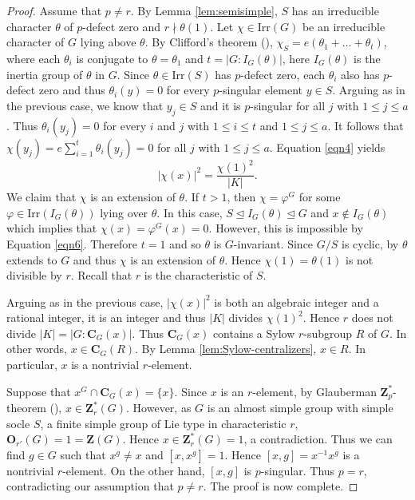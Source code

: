\documentclass[twoside,a4paper,reqno,12pt]{amsart}
\newcommand{\<}{\langle}
\renewcommand{\>}{\rangle}
\newcommand{\leqs}{\leqslant}
\newcommand{\OB}{\mathbf{O}}
\newcommand{\CB}{\mathbf{C}}
\newcommand{\ZB}{\mathbf{Z}}
\newcommand{\Irr}{\mathrm {Irr}}
\renewcommand{\leq}{\leqs}
\renewcommand{\:}{\colon}
\theoremstyle{definition}
\begin{document}
\begin{proof}
Assume that $p\neq r.$ By Lemma \ref{lem:semisimple}, $S$ has an irreducible character $\theta$ of $p$-defect zero and $r\nmid \theta(1)$.  Let $\chi\in\Irr(G)$ be an irreducible character of $G$ lying above $\theta$. By Clifford's theorem (\cite[Theorem 6.2]{Isaacs-ct}), $\chi_S=e(\theta_1+\dots+\theta_t)$, where each $\theta_i$ is conjugate to $\theta=\theta_1$ and $t=|G:I_G(\theta)|$, here $I_G(\theta)$ is the inertia group of $\theta$ in $G$.  Since $\theta\in\Irr(S)$ has $p$-defect zero, each $\theta_i$ also has $p$-defect zero and thus $\theta_i(y)=0$ for every $p$-singular element $y\in S.$ Arguing as in the previous case, we know that $y_j\in S$ and it is $p$-singular  for all $j$ with $1\leq j\leq a$. Thus $\theta_i(y_j)=0$ for every $i$ and $j$ with $1\leq i\leq t$ and $1\leq j\leq a.$ It follows that $\chi(y_j)=e\sum_{i=1}^t\theta_i(y_j)=0$ for all $j$ with $1\leq j\leq a$. Equation \eqref{eqn4} yields
\begin{equation}\label{eqn6}
|\chi(x)|^2=\frac{\chi(1)^2}{|K|}.
\end{equation}
We claim that $\chi$ is an extension of $\theta$.  If $t>1$, then $\chi=\varphi^G$ for some $\varphi\in\Irr(I_G(\theta))$ lying over $\theta$. In this case, $S\unlhd I_G(\theta)\unlhd G$ and $x\not\in I_G(\theta)$ which implies that $\chi(x)=\varphi^G(x)=0$. However, this is impossible by Equation \eqref{eqn6}. Therefore $t=1$ and so $\theta$ is $G$-invariant. Since $G/S$ is cyclic, by \cite[Corollary 11.22]{Isaacs-ct} $\theta$ extends to $G$ and thus $\chi$ is an extension of $\theta$. Hence $\chi(1)=\theta(1)$ is not divisible by $r$. Recall that $r$ is the characteristic of $S$.

Arguing as in the previous case, $|\chi(x)|^2$ is both an algebraic integer and a rational integer, it is an integer and thus $|K|$ divides $\chi(1)^2$. Hence $r$ does not divide $|K|=|G:\CB_G(x)|$. Thus $\CB_G(x)$ contains a Sylow $r$-subgroup $R$ of $G$. In other words, $x\in \CB_G(R)$. By Lemma \ref{lem:Sylow-centralizers}, $x\in R$. In particular, $x$ is a nontrivial $r$-element.    
 
 Suppose that $x^G\cap \CB_G(x)=\{x\}$. Since $x$ is an $r$-element, by Glauberman $\ZB_p^*$-theorem (\cite[Theorem 5.1]{GTT}), $x\in \ZB_r^*(G)$. However, as $G$ is an almost simple group with simple socle $S$, a finite simple group of Lie type in characteristic $r$, $\OB_{r'}(G)=1=\ZB(G)$. Hence $x\in \ZB_r^*(G)=1$, a contradiction.  Thus we can find $g\in G$ such that $x^g\neq x$ and $[x,x^g]=1$. Hence $[x,g]=x^{-1}x^g$ is a nontrivial $r$-element. On the other hand, $[x,g]$ is $p$-singular. Thus $p=r$, contradicting our assumption that $p\neq r.$  The proof is now complete.
\end{proof}
\end{document}
